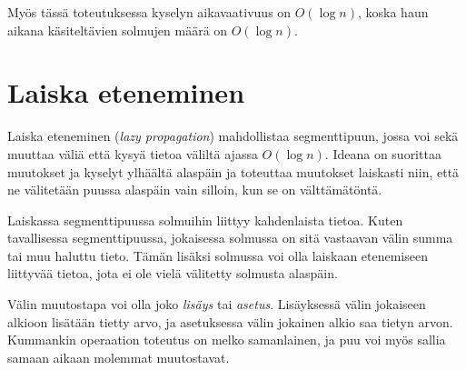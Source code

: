 \begin{center}
\end{center}
Myös tässä toteutuksessa kyselyn aikavaativuus on $O(\log n)$,
koska haun aikana käsiteltävien solmujen määrä on $O(\log n)$.

\section{Laiska eteneminen}


Laiska eteneminen (\textit{lazy propagation})
mahdollistaa segmenttipuun,
jossa voi sekä muuttaa väliä että kysyä tietoa väliltä
ajassa $O(\log n)$.
Ideana on suorittaa muutokset ja kyselyt ylhäältä
alaspäin ja toteuttaa muutokset laiskasti niin,
että ne välitetään puussa alaspäin vain silloin,
kun se on välttämätöntä.

Laiskassa segmenttipuussa solmuihin liittyy
kahdenlaista tietoa.
Kuten tavallisessa segmenttipuussa,
jokaisessa solmussa on sitä vastaavan välin
summa tai muu haluttu tieto.
Tämän lisäksi solmussa voi olla laiskaan etenemiseen
liittyvää tietoa, jota ei ole vielä välitetty
solmusta alaspäin.

Välin muutostapa voi olla joko
\textit{lisäys} tai \textit{asetus}.
Lisäyksessä välin jokaiseen alkioon lisätään
tietty arvo, ja asetuksessa välin
jokainen alkio saa tietyn arvon.
Kummankin operaation toteutus on melko samanlainen,
ja puu voi myös sallia samaan aikaan
molemmat muutostavat.

